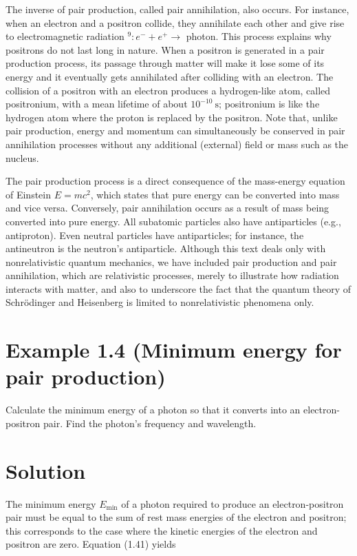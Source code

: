 \documentclass[10pt]{article}
\begin{document}
The inverse of pair production, called pair annihilation, also occurs. For instance, when an electron and a positron collide, they annihilate each other and give rise to electromagnetic radiation ${ }^{9}: e^{-}+e^{+} \rightarrow$ photon. This process explains why positrons do not last long in nature. When a positron is generated in a pair production process, its passage through matter will make it lose some of its energy and it eventually gets annihilated after colliding with an electron. The collision of a positron with an electron produces a hydrogen-like atom, called positronium, with a mean lifetime of about $10^{-10} \mathrm{~s}$; positronium is like the hydrogen atom where the proton is replaced by the positron. Note that, unlike pair production, energy and momentum can simultaneously be conserved in pair annihilation processes without any additional (external) field or mass such as the nucleus.

The pair production process is a direct consequence of the mass-energy equation of Einstein $E=m c^{2}$, which states that pure energy can be converted into mass and vice versa. Conversely, pair annihilation occurs as a result of mass being converted into pure energy. All subatomic particles also have antiparticles (e.g., antiproton). Even neutral particles have antiparticles; for instance, the antineutron is the neutron's antiparticle. Although this text deals only with nonrelativistic quantum mechanics, we have included pair production and pair annihilation, which are relativistic processes, merely to illustrate how radiation interacts with matter, and also to underscore the fact that the quantum theory of Schrödinger and Heisenberg is limited to nonrelativistic phenomena only.

\section*{Example 1.4 (Minimum energy for pair production)}
Calculate the minimum energy of a photon so that it converts into an electron-positron pair. Find the photon's frequency and wavelength.

\section*{Solution}
The minimum energy $E_{\min }$ of a photon required to produce an electron-positron pair must be equal to the sum of rest mass energies of the electron and positron; this corresponds to the case where the kinetic energies of the electron and positron are zero. Equation (1.41) yields
\end{document}
